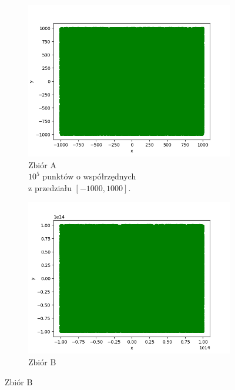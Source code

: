 \documentclass[11pt,a4paper]{article}
\begin{document}
\begin{figure}[H]
    \centering
    \begin{subfigure}[b]{0.46\textwidth}
        \centering
        \includegraphics[scale=0.5]{res/rec1.png}
        \caption{
            Zbiór A 
            \\ 
            \footnotesize$10^5$ punktów o współrzędnych
            \\
            z przedziału $[-1000, 1000]$.
        }
    \end{subfigure}
    \begin{subfigure}[b]{0.46\textwidth}
        \centering
        \includegraphics[scale=0.5]{res/rec2.png}
        \caption{
            Zbiór B 
            \\ 
}
\end{subfigure}
\end{figure}
\end{document}
